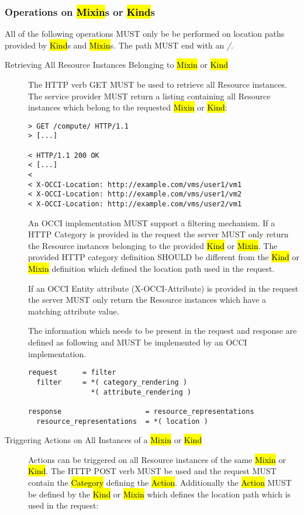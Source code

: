 \documentclass[10pt,a4paper]{article}
\begin{document}
\subsubsection{Operations on \hl{Mixin}s or \hl{Kind}s}
All of the following operations MUST only be be performed on location
paths provided by \hl{Kind}s and \hl{Mixin}s. The path MUST end with
an \emph{/}.

\begin{description}
  \item[Retrieving All Resource Instances Belonging to \hl{Mixin} or
    \hl{Kind}] The HTTP verb GET MUST be used to retrieve all Resource
    instances. The service provider MUST return a listing containing
    all Resource instances which belong to the requested \hl{Mixin} or
    \hl{Kind}:

\begin{verbatim}
> GET /compute/ HTTP/1.1
> [...]
 
< HTTP/1.1 200 OK
< [...]
< 
< X-OCCI-Location: http://example.com/vms/user1/vm1
< X-OCCI-Location: http://example.com/vms/user1/vm2
< X-OCCI-Location: http://example.com/vms/user2/vm1
\end{verbatim}

    An OCCI implementation MUST support a filtering mechanism. If a
    HTTP Category is provided in the request the server MUST only
    return the Resource instances belonging to the provided \hl{Kind}
    or \hl{Mixin}. The provided HTTP category definition SHOULD be
    different from the \hl{Kind} or \hl{Mixin} definition which
    defined the location path used in the request.

    If an OCCI Entity attribute (X-OCCI-Attribute) is provided in the
    request the server MUST only return the Resource instances which
    have a matching attribute value.

    The information which needs to be present in the request and
    response are defined as following and MUST be implemented by an
    OCCI implementation.

\begin{verbatim}
request      = filter
  filter     = *( category_rendering )
               *( attribute_rendering )

response                    = resource_representations
  resource_representations  = *( location ) 
\end{verbatim}

  \item[Triggering Actions on All Instances of a \hl{Mixin} or
    \hl{Kind}] Actions can be triggered on all Resource instances of
    the same \hl{Mixin} or \hl{Kind}. The HTTP POST verb MUST be used
    and the request MUST contain the \hl{Category} defining the
    \hl{Action}.  Additionally the \hl{Action} MUST be defined by the
    \hl{Kind} or \hl{Mixin} which defines the location path which is
    used in the request:


\end{description}
\end{document}
